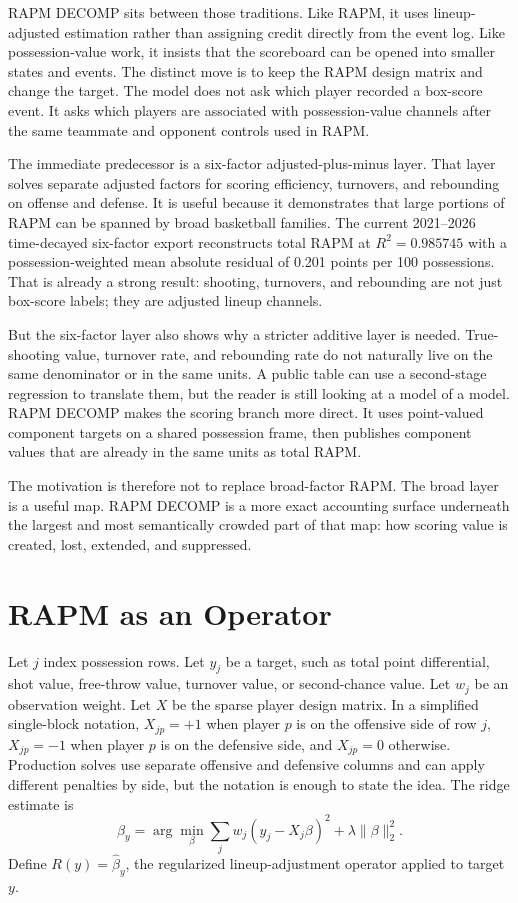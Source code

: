 \documentclass[11pt]{article}
\begin{document}
RAPM DECOMP sits between those traditions.  Like RAPM, it uses lineup-adjusted
estimation rather than assigning credit directly from the event log.  Like
possession-value work, it insists that the scoreboard can be opened into smaller
states and events.  The distinct move is to keep the RAPM design matrix and
change the target.  The model does not ask which player recorded a box-score
event.  It asks which players are associated with possession-value channels
after the same teammate and opponent controls used in RAPM.

The immediate predecessor is a six-factor adjusted-plus-minus layer.  That layer
solves separate adjusted factors for scoring efficiency, turnovers, and
rebounding on offense and defense.  It is useful because it demonstrates that
large portions of RAPM can be spanned by broad basketball families.  The current
2021--2026 time-decayed six-factor export reconstructs total RAPM at
$R^2=0.985745$ with a possession-weighted mean absolute residual of 0.201
points per 100 possessions.  That is already a strong result: shooting,
turnovers, and rebounding are not just box-score labels; they are adjusted
lineup channels.

But the six-factor layer also shows why a stricter additive layer is needed.
True-shooting value, turnover rate, and rebounding rate do not naturally live on
the same denominator or in the same units.  A public table can use a
second-stage regression to translate them, but the reader is still looking at a
model of a model.  RAPM DECOMP makes the scoring branch more direct.  It uses
point-valued component targets on a shared possession frame, then publishes
component values that are already in the same units as total RAPM.

The motivation is therefore not to replace broad-factor RAPM.  The broad layer
is a useful map.  RAPM DECOMP is a more exact accounting surface underneath the
largest and most semantically crowded part of that map: how scoring value is
created, lost, extended, and suppressed.

\section{RAPM as an Operator}

Let $j$ index possession rows.  Let $y_j$ be a target, such as total point
differential, shot value, free-throw value, turnover value, or second-chance
value.  Let $w_j$ be an observation weight.  Let $X$ be the sparse player design
matrix.  In a simplified single-block notation, $X_{jp}=+1$ when player $p$ is
on the offensive side of row $j$, $X_{jp}=-1$ when player $p$ is on the
defensive side, and $X_{jp}=0$ otherwise.
Production solves use separate offensive and defensive columns and can apply
different penalties by side, but the notation is enough to state the idea.
The ridge estimate is
\[
\hat{\beta}_y =
\arg\min_{\beta}
\sum_j w_j (y_j - X_j\beta)^2 + \lambda \|\beta\|_2^2 .
\]
Define $R(y)=\hat{\beta}_y$, the regularized lineup-adjustment operator applied
to target $y$.
\end{document}
